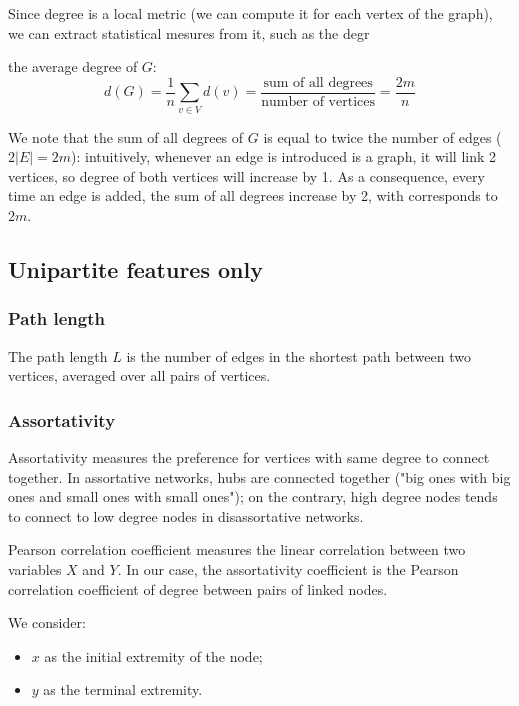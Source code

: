 \documentclass[table]{report}
\begin{document}
Since degree is a local metric (we can compute it for each vertex of the graph), we can extract statistical mesures from it, such as the degr

the average degree of $G$: 
$$d(G) =  \dfrac{1}{n} \sum_{v \in V}^{} d(v) = \dfrac{\text{sum of all degrees}}{\text{number of vertices}} = \dfrac{2m}{n}$$

We note that the sum of all degrees of $G$ is equal to twice the number of edges ($2 |E| = 2m$): intuitively,  whenever an edge is introduced is a graph, it will link 2 vertices, so degree of both vertices will increase by 1. As a consequence, every time an edge is added, the sum of all degrees increase by 2, with corresponds to $2m$.

 

%


\subsection{Unipartite features only}


\subsubsection{Path length}

The path length $L$ is the number of edges in the shortest path between two vertices, averaged over all pairs of vertices.

\subsubsection{Assortativity}


Assortativity measures the preference for vertices with same degree to connect together. In assortative networks, hubs are connected together ("big ones with big ones and small ones with small ones"); on the contrary, high degree nodes tends to connect to low degree nodes in disassortative networks.

Pearson correlation coefficient measures the linear correlation between two variables $X$ and $Y$.
In our case, the assortativity coefficient is the Pearson correlation coefficient of degree between pairs of linked nodes.

We consider:

\begin{itemize}[noitemsep]
    \item $x$ as the initial extremity of the node;
    \item $y$ as the terminal extremity.
\end{itemize}
\end{document}
